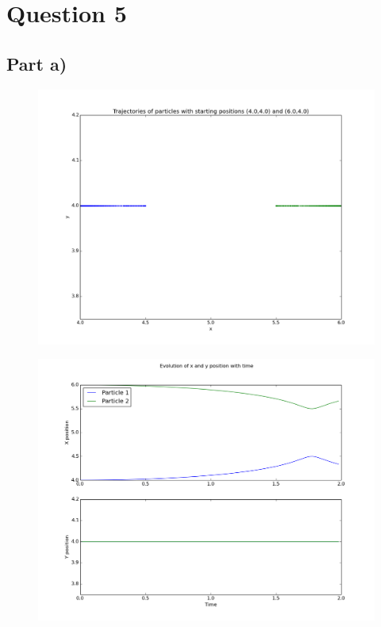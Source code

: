 \documentclass[a4paper,12pt]{article}
\begin{document}
\section{Question 5}

\subsection{Part a)}
\begin{figure}[H]
\centering
\includegraphics[width = \linewidth]{lab6q5a.png}
\caption{}
\label{fig:q5a}
\end{figure}

\begin{figure}[H]
\centering
\includegraphics[width = \linewidth]{lab6q5ai.png}
\caption{}
\label{fig:q5ai}
\end{figure}
\end{document}

